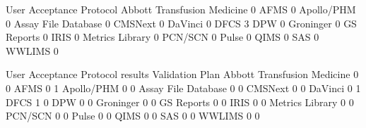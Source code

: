 \documentclass{article}
\begin{document}
\begin{Schunk}
\begin{Soutput}
                              User Acceptance Protocol
  Abbott Transfusion Medicine                        0
  AFMS                                               0
  Apollo/PHM                                         0
  Assay File Database                                0
  CMSNext                                            0
  DaVinci                                            0
  DFCS                                               3
  DPW                                                0
  Groninger                                          0
  GS Reports                                         0
  IRIS                                               0
  Metrics Library                                    0
  PCN/SCN                                            0
  Pulse                                              0
  QIMS                                               0
  SAS                                                0
  WWLIMS                                             0
                             
                              User Acceptance Protocol results Validation Plan
  Abbott Transfusion Medicine                                0               0
  AFMS                                                       0               1
  Apollo/PHM                                                 0               0
  Assay File Database                                        0               0
  CMSNext                                                    0               0
  DaVinci                                                    0               1
  DFCS                                                       1               0
  DPW                                                        0               0
  Groninger                                                  0               0
  GS Reports                                                 0               0
  IRIS                                                       0               0
  Metrics Library                                            0               0
  PCN/SCN                                                    0               0
  Pulse                                                      0               0
  QIMS                                                       0               0
  SAS                                                        0               0
  WWLIMS                                                     0               0
\end{Soutput}
\end{Schunk}
\end{document}
